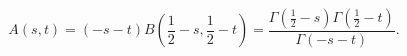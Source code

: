 \begin{equation}
A(s,t) = (-s-t)B(\frac{1}{2}-s,\frac{1}{2}-t) =
\frac{\Gamma(\frac{1}{2}-s)\Gamma(\frac{1}{2}-t)}{\Gamma(-s-t)}.
\label{1}
\end{equation}

